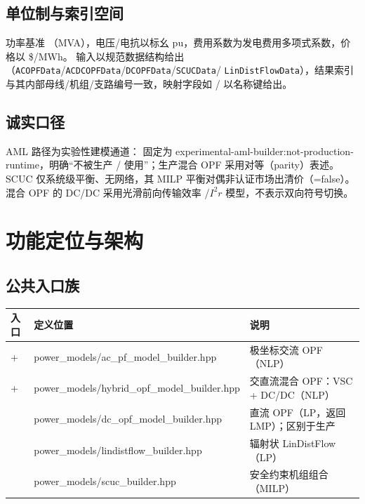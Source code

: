 \documentclass[UTF8,fontset=fandol,a4paper,11pt]{ctexart}
\begin{document}
\subsection{单位制与索引空间}
功率基准 （MVA），电压/电抗以标幺 pu，费用系数为发电费用多项式系数，价格以 \$/MWh。
输入以规范数据结构给出（\texttt{ACOPFData}/\texttt{ACDCOPFData}/\texttt{DCOPFData}/\texttt{SCUCData}/
\texttt{LinDistFlowData}），结果索引与其内部母线/机组/支路编号一致，映射字段如 /
以名称键给出。

\subsection{诚实口径}
AML 路径为实验性建模通道： 固定为
experimental-aml-builder:not-production-runtime，明确“不被生产 /
 使用”；生产混合 OPF 采用对等（parity）表述。SCUC 仅系统级平衡、无网络，其
MILP 平衡对偶非认证市场出清价（=false）。混合 OPF 的 DC/DC 采用光滑前向传输效率
/$I^2r$ 模型，不表示双向符号切换。

\section{功能定位与架构}
\subsection{公共入口族}
\begin{center}\footnotesize
\begin{tabular}{@{}L{6.6cm}L{3.0cm}L{5.4cm}@{}}
\toprule
入口 & 定义位置 & 说明\\
\midrule
{} +  & power\_models/ac\_pf\_model\_builder.hpp & 极坐标交流 OPF（NLP）\\
 +  & power\_models/hybrid\_opf\_model\_builder.hpp & 交直流混合 OPF：VSC + DC/DC（NLP）\\
 & power\_models/dc\_opf\_model\_builder.hpp & 直流 OPF（LP，返回 LMP）；区别于生产 \\
 & power\_models/lindistflow\_builder.hpp & 辐射状 LinDistFlow（LP）\\
 & power\_models/scuc\_builder.hpp & 安全约束机组组合（MILP）\\
\bottomrule
\end{tabular}
\end{center}
\end{document}
